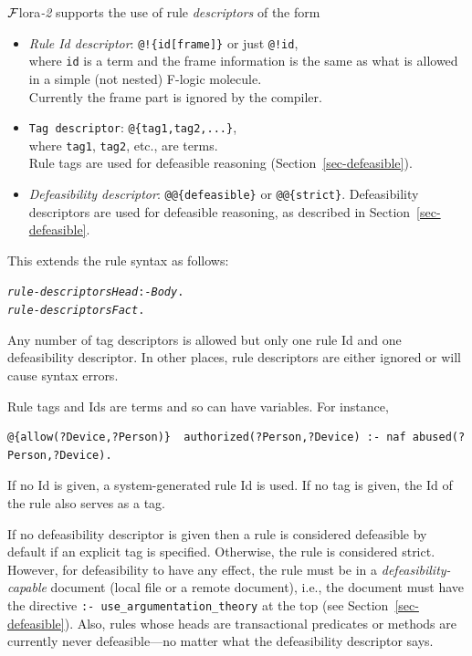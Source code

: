 \documentclass[11pt]{article}
\newcommand{\FLORA}{{\mbox{\sc ${\cal F}${lora}\rm\emph{-2}}}\xspace}
\begin{document}
\FLORA supports the use of rule \emph{descriptors} of the form
\begin{itemize}
\item  \emph{Rule Id descriptor}:   \texttt{@!\{id[frame]\}}  or just \texttt{@!{id}}, \\
  where \texttt{id} is a term and the frame information is the same as what
  is allowed in a simple (not nested) F-logic molecule. \\
  Currently the frame part is ignored by the compiler.
\item \texttt{Tag descriptor}:  \texttt{@\{tag1,tag2,...\}}, \\
  where \texttt{tag1}, \texttt{tag2}, etc., are terms.\\
  Rule tags are used for defeasible reasoning
  (Section~\ref{sec-defeasible}).
\item \emph{Defeasibility descriptor}:  \texttt{@@\{defeasible\}}  or
  \texttt{@@\{strict\}}. Defeasibility descriptors are used for defeasible
  reasoning, as described in Section~\ref{sec-defeasible}.
\end{itemize}
This extends the rule syntax as follows:
\begin{alltt}
   \emph{rule-descriptors} \emph{Head} :- \emph{Body}.
   \emph{rule-descriptors} \emph{Fact}.
\end{alltt}
Any number of tag descriptors is allowed but only one rule Id and one
defeasibility descriptor.
In other places, rule descriptors are either ignored or will cause syntax
errors. 

Rule tags and Ids are terms and so can have variables. For instance,
\begin{verbatim}
@{allow(?Device,?Person)}  authorized(?Person,?Device) :- naf abused(?Person,?Device).
\end{verbatim}
If no Id is given, a system-generated rule Id is used. If no tag is given,
the Id of the rule also serves as a tag.

If no defeasibility descriptor is given then a rule is considered
defeasible by default if an explicit tag is specified.
Otherwise, the rule is considered strict.  However, for defeasibility to
have any effect, the rule must be in a  \emph{defeasibility-capable} document (local file or a
remote document), i.e., the document
must have the directive \texttt{:- use\_argumentation\_theory} at
the top (see Section~\ref{sec-defeasible}).
Also, rules whose heads are transactional predicates or methods are
currently never
defeasible---no matter what the defeasibility descriptor says.
\end{document}
